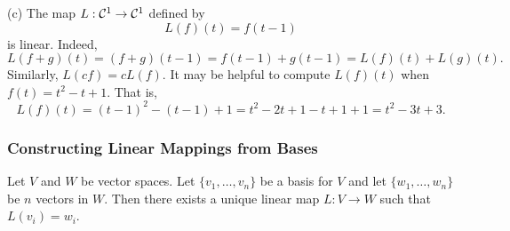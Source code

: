 \documentclass{ximera}
\begin{document}
\noindent (c) The map $L:{\cal C}^1\to{\cal C}^1$ defined by
\[
L(f)(t)=f(t-1)
\]
is linear.  Indeed,
\[
L(f+g)(t) = (f+g)(t-1) = f(t-1) + g(t-1) = L(f)(t) + L(g)(t).
\]
Similarly, $L(cf)=cL(f)$.  It may be helpful to compute $L(f)(t)$ when
$f(t)=t^2-t+1$.  That is,
\[
L(f)(t) = (t-1)^2-(t-1)+1 = t^2-2t+1-t+1+1 = t^2-3t+3.
\]


\subsubsection*{Constructing Linear Mappings from Bases}

\begin{thm} \label{L:linmapfrombasis}
Let $V$ and $W$ be vector spaces.  Let $\{v_1,\ldots,v_n\}$ be a
basis for $V$ and let $\{w_1,\ldots,w_n\}$ be $n$ vectors in $W$.
Then there exists a unique linear map $L:V\to W$ such that $L(v_i)=w_i$.
\end{thm}
\end{document}
